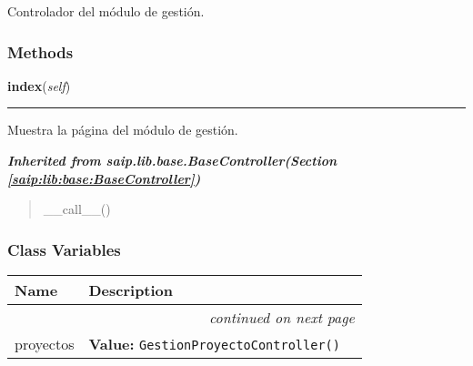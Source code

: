 Controlador del módulo de gestión.



  \subsubsection{Methods}

    \label{saip:controllers:gestion_controller:GestionController:index}

    \vspace{0.5ex}

\hspace{.8\funcindent}\begin{boxedminipage}{\funcwidth}

    \raggedright \textbf{index}(\textit{self})

    \vspace{-1.5ex}

    \rule{\textwidth}{0.5\fboxrule}
\setlength{\parskip}{2ex}
    Muestra la página del módulo de gestión.

\setlength{\parskip}{1ex}
    \end{boxedminipage}


\large{\textbf{\textit{Inherited from saip.lib.base.BaseController\textit{(Section \ref{saip:lib:base:BaseController})}}}}

\begin{quote}
\_\_call\_\_()
\end{quote}


  \subsubsection{Class Variables}

    \vspace{-1cm}
\hspace{\varindent}\begin{longtable}{|p{\varnamewidth}|p{\vardescrwidth}|l}
\cline{1-2}
\cline{1-2} \centering \textbf{Name} & \centering \textbf{Description}& \\
\cline{1-2}
\endhead\cline{1-2}\multicolumn{3}{r}{\small\textit{continued on next page}}\\\endfoot\cline{1-2}
\endlastfoot\raggedright p\-r\-o\-y\-e\-c\-t\-o\-s\- & \raggedright \textbf{Value:} 
{\tt GestionProyectoController()}&\\
\cline{1-2}
\end{longtable}

